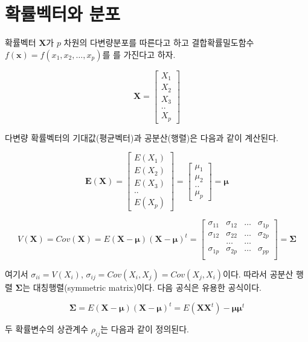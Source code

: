 \documentclass[
  11pt,
  a4paper,
  oneside]{scrbook}
\theoremstyle{definition}
\theoremstyle{plain}
\theoremstyle{definition}
\theoremstyle{definition}
\theoremstyle{remark}
\begin{document}
\section{확률벡터와
분포}\label{uxd655uxb960uxbca1uxd130uxc640-uxbd84uxd3ec}

확률벡터 \(\pmb X\)가 \(p\) 차원의 다변량분포를 따른다고 하고
결합확률밀도함수 \(f(\pmb x) =f(x_1,x_2,\dots,x_p)\)를 를 가진다고 하자.

\[
\pmb X =
  \begin{bmatrix}
X_1 \\
X_2 \\
X_3 \\
..  \\
X_p
\end{bmatrix}
\]

다변량 확률벡터의 기대값(평균벡터)과 공분산(행렬)은 다음과 같이
계산된다.

\[
\pmb E(\pmb X) =
  \begin{bmatrix}
E(X_1) \\
E(X_2) \\
E(X_3) \\
..  \\
E(X_p)
\end{bmatrix}
= 
  \begin{bmatrix}
\mu_1 \\
\mu_2 \\
..  \\
\mu_p
\end{bmatrix}
=\pmb \mu
\]

\[
V(\pmb X) =Cov(\pmb X) = E (\pmb X-\pmb \mu) (\pmb X-\pmb \mu)^t 
= 
  \begin{bmatrix}
\sigma_{11} & \sigma_{12} & \dots & \sigma_{1p} \\
\sigma_{12} & \sigma_{22} & \dots & \sigma_{2p} \\
& \dots & \dots & \\
\sigma_{1p} & \sigma_{2p} & \dots & \sigma_{pp} \\
\end{bmatrix}
= \pmb \Sigma
\]

여기서 \(\sigma_{ii}=V(X_i)\),
\(\sigma_{ij} = Cov(X_i, X_j)=Cov(X_j, X_i)\)이다. 따라서 공분산 행렬
\(\pmb \Sigma\)는 대칭행렬(symmetric matrix)이다. 다음 공식은 유용한
공식이다.

\[ \pmb \Sigma = E (\pmb X-\pmb \mu) (\pmb X-\pmb \mu)^t  = E(\pmb X \pmb X^t)-\pmb \mu \pmb \mu^t \]

두 확률변수의 상관계수 \(\rho_{ij}\)는 다음과 같이 정의된다.
\end{document}
